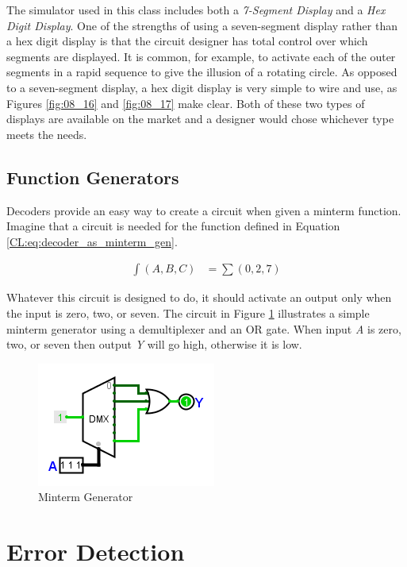 The \Le simulator used in this class includes both a \emph{7-Segment Display} and a \emph{Hex Digit Display}. One of the strengths of using a seven-segment display rather than a hex digit display is that the circuit designer has total control over which segments are displayed. It is common, for example, to activate each of the outer segments in a rapid sequence to give the illusion of a rotating circle. As opposed to a seven-segment display, a hex digit display is very simple to wire and use, as Figures \ref{fig:08_16} and \ref{fig:08_17} make clear. Both of these two types of displays are available on the market and a designer would chose whichever type meets the needs. 

\subsection{Function Generators}
\label{CL:subsec:function_generators}

Decoders provide an easy way to create a circuit when given a minterm function. Imagine that a circuit is needed for the function defined in Equation \ref{CL:eq:decoder_as_minterm_gen}.

\begin{align}
  \label{CL:eq:decoder_as_minterm_gen}
  \int(A,B,C) &= \sum(0,2,7)
\end{align}

Whatever this circuit is designed to do, it should activate an output only when the input is zero, two, or seven. The circuit in Figure \ref{fig:08_18} illustrates a simple minterm generator using a demultiplexer and an \textsf{OR} gate. When input \emph{A} is zero, two, or seven then output \emph{Y} will go high, otherwise it is low.

\begin{figure}[H]
	\centering
	\includegraphics[width=\maxwidth{.95\linewidth}]{gfx/08_18}
	\caption{Minterm Generator}
	\label{fig:08_18}
\end{figure}

\section{Error Detection}
\label{CL:sec:error_detection}

